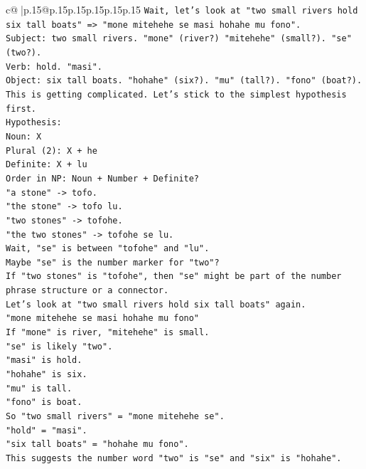 \documentclass{article}
\begin{document}
{\begin{supertabular}{c@{$\;$}|p{.15\linewidth}@{}p{.15\linewidth}p{.15\linewidth}p{.15\linewidth}p{.15\linewidth}p{.15\linewidth}}
{{{\texttt{Wait, let's look at "two small rivers hold six tall boats" => "mone mitehehe se masi hohahe mu fono".} \\
\texttt{Subject: two small rivers. "mone" (river?) "mitehehe" (small?). "se" (two?).} \\
\texttt{Verb: hold. "masi".} \\
\texttt{Object: six tall boats. "hohahe" (six?). "mu" (tall?). "fono" (boat?).} \\
\texttt{This is getting complicated. Let's stick to the simplest hypothesis first.} \\
\texttt{Hypothesis:} \\
\texttt{Noun: X} \\
\texttt{Plural (2): X + he} \\
\texttt{Definite: X + lu} \\
\texttt{Order in NP: Noun + Number + Definite?} \\
\texttt{"a stone" {-}> tofo.} \\
\texttt{"the stone" {-}> tofo lu.} \\
\texttt{"two stones" {-}> tofohe.} \\
\texttt{"the two stones" {-}> tofohe se lu.} \\
\texttt{Wait, "se" is between "tofohe" and "lu".} \\
\texttt{Maybe "se" is the number marker for "two"?} \\
\texttt{If "two stones" is "tofohe", then "se" might be part of the number phrase structure or a connector.} \\
\texttt{Let's look at "two small rivers hold six tall boats" again.} \\
\texttt{"mone mitehehe se masi hohahe mu fono"} \\
\texttt{If "mone" is river, "mitehehe" is small.} \\
\texttt{"se" is likely "two".} \\
\texttt{"masi" is hold.} \\
\texttt{"hohahe" is six.} \\
\texttt{"mu" is tall.} \\
\texttt{"fono" is boat.} \\
\texttt{So "two small rivers" = "mone mitehehe se".} \\
\texttt{"hold" = "masi".} \\
\texttt{"six tall boats" = "hohahe mu fono".} \\
\texttt{This suggests the number word "two" is "se" and "six" is "hohahe".} \\
}}}
\end{supertabular}}
\end{document}
